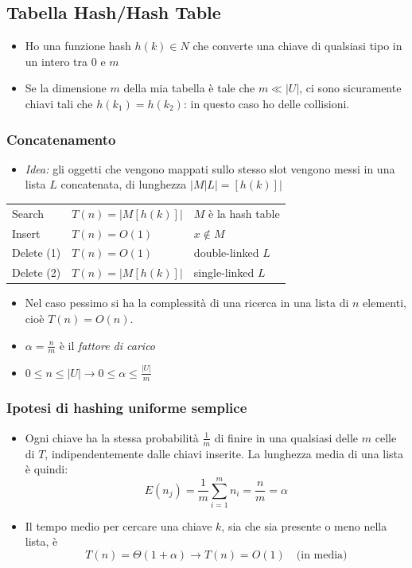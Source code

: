 \documentclass[10pt,a4paper]{article}
\begin{document}
\begin{multicols*}{2}
\subsection*{Tabella Hash/Hash Table}
\begin{itemize}
    \item Ho una funzione hash $h(k) \in N$ che converte una chiave di qualsiasi tipo in un intero tra $0$ e $m$
    \item Se la dimensione $m$ della mia tabella è tale che $m \ll |U|$, ci sono sicuramente chiavi tali che $h(k_1) = h(k_2)$: in questo caso ho delle collisioni.
\end{itemize}
\subsubsection*{Concatenamento}
\begin{itemize}
    \item \emph{Idea:} gli oggetti che vengono mappati sullo stesso slot vengono messi in una lista $L$ concatenata, di lunghezza $|M|L| = [h(k)]|$
\end{itemize}
\begin{tabular}{l l l}
    Search & $T(n) = |M[h(k)]|$ & $M$ è la hash table\\
    Insert & $T(n) = O(1)$ & $x \not\in M$\\
    Delete (1) & $T(n) = O(1)$ & double-linked $L$\\
    Delete (2) & $T(n) = |M[h(k)]|$ & single-linked $L$\\
\end{tabular}
\begin{itemize}
    \item Nel caso pessimo si ha la complessità di una ricerca in una lista di $n$ elementi, cioè $T(n) = O(n)$.
    \item $\alpha = \frac{n}{m}$ è il \emph{fattore di carico}
    \item $0\le n \le |U| \rightarrow 0 \le \alpha \le \frac{|U|}{m}$
\end{itemize}
\subsubsection*{Ipotesi di hashing uniforme semplice}
\begin{itemize}
    \item Ogni chiave ha la stessa probabilità $\frac{1}{m}$ di finire in una qualsiasi delle $m$ celle di $T$, indipendentemente dalle chiavi inserite. La lunghezza media di una lista è quindi:
    \begin{equation*}
        E\left(n_j\right) = \frac{1}{m}\sum^m_{i=1}n_i = \frac{n}{m} = \alpha
    \end{equation*}
    \item Il tempo medio per cercare una chiave $k$, sia che sia presente o meno nella lista, è 
    \begin{equation*}
        T(n) = \varTheta(1+\alpha) \rightarrow T(n) = O(1) \quad\text{(in media)}
    \end{equation*}
\end{itemize}

\end{multicols*}
\end{document}
